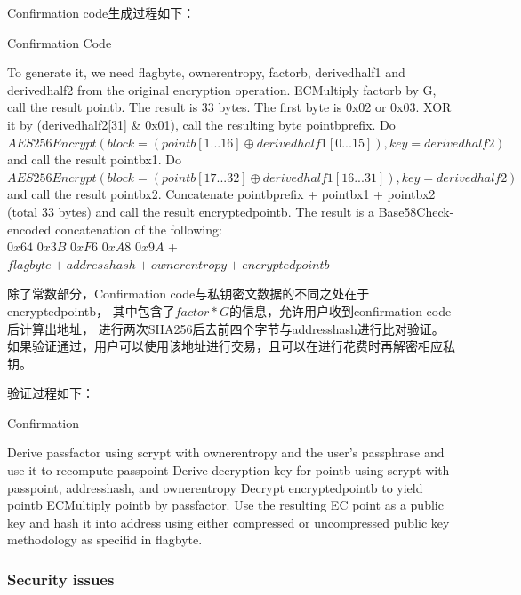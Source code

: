 Confirmation code生成过程如下：

\begin{algorithm}[tbp]\footnotesize
\caption{Confirmation Code}
  	\begin{algorithmic}[1]
	   \STATE To generate it, we need flagbyte, ownerentropy, factorb, derivedhalf1 and 
	   derivedhalf2 from the original encryption operation.
		\STATE ECMultiply factorb by G, call the result pointb. The result is 33 bytes.
		\STATE The first byte is 0x02 or 0x03. XOR it by (derivedhalf2[31] \& 0x01), call 
		the resulting byte pointbprefix.
		\STATE Do $AES256Encrypt(block = (pointb[1...16] \oplus derivedhalf1[0...15]), 
		key = derivedhalf2)$ and call the result pointbx1.
		\STATE Do $AES256Encrypt(block = (pointb[17...32] \oplus derivedhalf1[16...31]),
		 key = derivedhalf2)$ and call the result pointbx2.
		\STATE Concatenate pointbprefix + pointbx1 + pointbx2 (total 33 bytes) 
		and call the result encryptedpointb.  
		\STATE The result is a Base58Check-encoded concatenation of the following: \\ 
		 $0x64$ $0x3B$ $0xF6$ $0xA8$ $0x9A$ + $flagbyte + addresshash + ownerentropy + 
		 encryptedpointb$
    \end{algorithmic}
\end{algorithm}

除了常数部分，Confirmation code与私钥密文数据的不同之处在于encryptedpointb，
其中包含了$factor*G$的信息，允许用户收到confirmation code后计算出地址，
进行两次SHA256后去前四个字节与addresshash进行比对验证。
如果验证通过，用户可以使用该地址进行交易，且可以在进行花费时再解密相应私钥。

验证过程如下：

\begin{algorithm}[tbp]\footnotesize
\caption{Confirmation}
  	\begin{algorithmic}[1]
	   \STATE Derive passfactor using scrypt with ownerentropy and 
	   the user's passphrase and use it to recompute passpoint
		\STATE Derive decryption key for pointb using scrypt with 
		passpoint, addresshash, and ownerentropy
		\STATE Decrypt encryptedpointb to yield pointb
		\STATE ECMultiply pointb by passfactor. Use the resulting 
		EC point as a public key and hash it into address using either 
		compressed or  uncompressed public key methodology as specifid in flagbyte.
    \end{algorithmic}
\end{algorithm}


\subsubsection{ Security issues}

